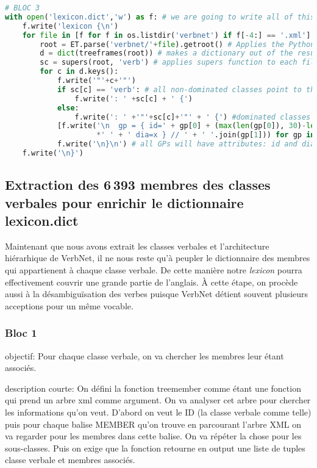 \begin{lstlisting}[language=Python, caption = Importation de l'architecture des classes verbales, label=fig:archivn]
# BLOC 3
with open('lexicon.dict','w') as f: # we are going to write all of this block into lexicon.dict
    f.write('lexicon {\n')
    for file in [f for f in os.listdir('verbnet') if f[-4:] == '.xml']: # open VerbNet XMl files
        root = ET.parse('verbnet/'+file).getroot() # Applies the Python Element Tree module
        d = dict(treeframes(root)) # makes a dictionary out of the results of treeframes on a file
        sc = supers(root, 'verb') # applies supers function to each file
        for c in d.keys():
            f.write('"'+c+'"')
            if sc[c] == 'verb': # all non-dominated classes point to the default verb class
                f.write(': ' +sc[c] + ' {') 
            else:
                f.write(': ' +'"'+sc[c]+'"' + ' {') #dominated classes point towards their governor
            [f.write('\n  gp = { id=' + gp[0] + (max(len(gp[0]), 30)-len(gp[0]))
                     *' ' + ' dia=x } // ' + ' '.join(gp[1])) for gp in d[c]]
            f.write('\n}\n') # all GPs will have attributes: id and dia
    f.write('\n}')
\end{lstlisting}

\subsection{Extraction des 6\,393 membres des classes verbales pour enrichir le dictionnaire lexicon.dict} \label{extracmembre}

Maintenant que nous avons extrait les classes verbales et l'architecture hiérarhique de VerbNet, il ne nous reste qu'à peupler le dictionnaire des membres qui appartienent à chaque classe verbale. De cette manière notre \emph{lexicon} pourra effectivement couvrir une grande partie de l'anglais. À cette étape, on procède aussi à la désambiguïsation des verbes puisque VerbNet détient souvent plusieurs acceptions pour un même vocable.

\subsubsection{Bloc 1}
objectif: Pour chaque classe verbale, on va chercher les membres leur étant associés.

description courte: On défini la fonction treemember comme étant une fonction qui prend un arbre xml comme argument. On va analyser cet arbre pour chercher les informations qu'on veut. D'abord on veut le ID (la classe verbale comme telle) puis pour chaque balise MEMBER qu'on trouve en parcourant l'arbre XML on va regarder pour les membres dans cette balise. On va répéter la chose pour les sous-classes. Puis on exige que la fonction retourne en output une liste de tuples classe verbale et membres associés.

